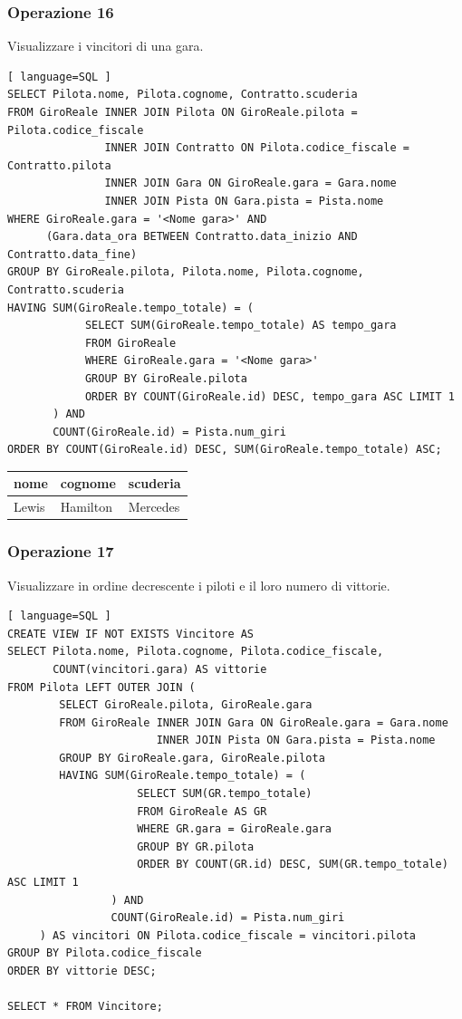 \documentclass[11pt]{article}
\begin{document}
\subsubsection{Operazione 16}
Visualizzare i vincitori di una gara.
\begin{lstlisting}[ language=SQL ]
SELECT Pilota.nome, Pilota.cognome, Contratto.scuderia
FROM GiroReale INNER JOIN Pilota ON GiroReale.pilota = Pilota.codice_fiscale
               INNER JOIN Contratto ON Pilota.codice_fiscale = Contratto.pilota
               INNER JOIN Gara ON GiroReale.gara = Gara.nome
               INNER JOIN Pista ON Gara.pista = Pista.nome
WHERE GiroReale.gara = '<Nome gara>' AND
      (Gara.data_ora BETWEEN Contratto.data_inizio AND Contratto.data_fine)
GROUP BY GiroReale.pilota, Pilota.nome, Pilota.cognome, Contratto.scuderia
HAVING SUM(GiroReale.tempo_totale) = (
            SELECT SUM(GiroReale.tempo_totale) AS tempo_gara
            FROM GiroReale
            WHERE GiroReale.gara = '<Nome gara>'
            GROUP BY GiroReale.pilota
            ORDER BY COUNT(GiroReale.id) DESC, tempo_gara ASC LIMIT 1
       ) AND
       COUNT(GiroReale.id) = Pista.num_giri
ORDER BY COUNT(GiroReale.id) DESC, SUM(GiroReale.tempo_totale) ASC;
\end{lstlisting}

\begin{table}[H]
    \centering
    \begin{tabular}{|l|l|l|}
    \hline
        \textbf{nome} & \textbf{cognome} & \textbf{scuderia} \\ \hline
        Lewis & Hamilton & Mercedes \\ \hline
    \end{tabular}
\end{table}


\subsubsection{Operazione 17}
Visualizzare in ordine decrescente i piloti e il loro numero di vittorie.
\begin{lstlisting}[ language=SQL ]
CREATE VIEW IF NOT EXISTS Vincitore AS
SELECT Pilota.nome, Pilota.cognome, Pilota.codice_fiscale, 
       COUNT(vincitori.gara) AS vittorie
FROM Pilota LEFT OUTER JOIN (
        SELECT GiroReale.pilota, GiroReale.gara
        FROM GiroReale INNER JOIN Gara ON GiroReale.gara = Gara.nome
                       INNER JOIN Pista ON Gara.pista = Pista.nome
        GROUP BY GiroReale.gara, GiroReale.pilota
        HAVING SUM(GiroReale.tempo_totale) = (
                    SELECT SUM(GR.tempo_totale)
                    FROM GiroReale AS GR
                    WHERE GR.gara = GiroReale.gara
                    GROUP BY GR.pilota
                    ORDER BY COUNT(GR.id) DESC, SUM(GR.tempo_totale) ASC LIMIT 1
                ) AND
                COUNT(GiroReale.id) = Pista.num_giri
     ) AS vincitori ON Pilota.codice_fiscale = vincitori.pilota
GROUP BY Pilota.codice_fiscale
ORDER BY vittorie DESC;

SELECT * FROM Vincitore;
\end{lstlisting}
\end{document}
